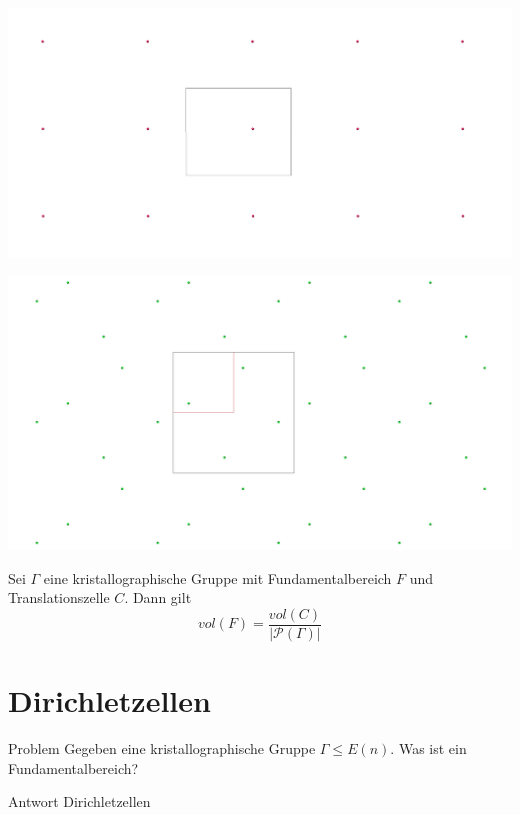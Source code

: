 \documentclass{beamer}
\theoremstyle{plain}
\renewcommand{\P}{\mathcal{P}}
\begin{document}
\begin{frame}
    \centering
    \includegraphics[width=\textwidth]{images/p1-escher.png}
\end{frame}

\begin{frame}
    \centering
    \includegraphics[width=\textwidth]{images/p4-escher.png}
\end{frame}

\begin{frame}
    \begin{theorem}
        Sei $\Gamma$ eine kristallographische Gruppe mit Fundamentalbereich $F$ und Translationszelle $C$. Dann gilt
        $$
            vol(F) = \frac{vol(C)}{|\P(\Gamma)|}
        $$
    \end{theorem}
\end{frame}

\section{Dirichletzellen}
\begin{frame}
    \begin{alertblock}{Problem}
        Gegeben eine kristallographische Gruppe $\Gamma \leq E(n)$. Was ist ein Fundamentalbereich?
    \end{alertblock}
    \pause
    \begin{exampleblock}{Antwort}
        Dirichletzellen
    \end{exampleblock}
\end{frame}
\end{document}
